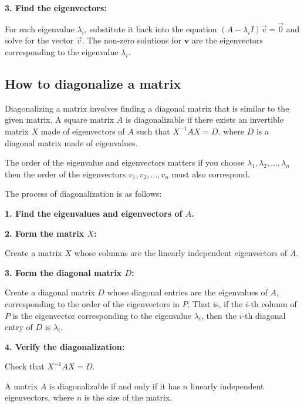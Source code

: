 \textbf{3. Find the eigenvectors:}

For each eigenvalue \(\lambda_i\), substitute it back into the equation \((A - \lambda_i I)\vec{v} = \vec{0}\) and solve for the vector \(\vec{v}\). The non-zero solutions for \(\mathbf{v}\) are the eigenvectors corresponding to the eigenvalue \(\lambda_i\).

\subsection{How to diagonalize a matrix}

Diagonalizing a matrix involves finding a diagonal matrix that is similar to the given matrix. 
A square matrix \(A\) is diagonalizable if there exists an invertible matrix \(X\) made of eigenvectors of 
\(A\) such that \(X^{-1}AX = D\), where \(D\) is a diagonal matrix made of eigenvalues.

The order of the eigenvalue and eigenvectors matters if you choose \(\lambda_1, \lambda_2, \dots, \lambda_n\) then the 
order of the eigenvectors \(v_1, v_2, \dots, v_n\) must also correspond.
\vspace{\baselineskip}

The process of diagonalization is as follows:
\vspace{\baselineskip}

\textbf{1. Find the eigenvalues and eigenvectors of \(A\).}
\vspace{\baselineskip}

\textbf{2. Form the matrix \(X\):}

Create a matrix \(X\) whose columns are the linearly independent eigenvectors of \(A\).
\vspace{\baselineskip}

\textbf{3. Form the diagonal matrix \(D\):} 

Create a diagonal matrix \(D\) whose diagonal entries are the eigenvalues of \(A\), corresponding to the order of the eigenvectors in \(P\). That is, if the \(i\)-th column of \(P\) is the eigenvector corresponding to the eigenvalue \(\lambda_i\), then the \(i\)-th diagonal entry of \(D\) is \(\lambda_i\).
\vspace{\baselineskip}

\textbf{4. Verify the diagonalization:}
    
Check that \(X^{-1}AX = D\).
\vspace{\baselineskip}

A matrix \(A\) is diagonalizable if and only if it has \(n\) linearly independent eigenvectors, where \(n\) is the size of the matrix.
\vspace{\baselineskip}

